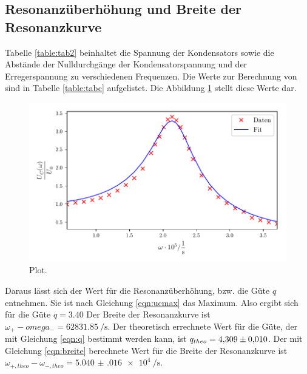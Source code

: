 \subsection{Resonanzüberhöhung und Breite der Resonanzkurve}
Tabelle \ref{table:tab2} beinhaltet die Spannung der Kondensators
sowie die Abstände der Nulldurchgänge der Kondensatorspannung
und der Erregerspannung zu verschiedenen Frequenzen.
Die Werte zur Berechnung von %
sind in Tabelle \ref{table:tabc} aufgelistet.
Die Abbildung \ref{fig:plotc} stellt diese Werte dar.


\begin{figure}
  \centering
  \includegraphics{build/plotc.pdf}
  \caption{Plot.}
  \label{fig:plotc}
\end{figure}
\noindent Daraus lässt sich der Wert für die Resonanzüberhöhung, bzw. die Güte $q$ entnehmen.
Sie ist nach Gleichung \eqref{eqn:ucmax} das Maximum.
Also ergibt sich für die Güte $q = \num{3.40}$
Der Breite der Resonanzkurve ist
$\omega_{+} - omega_{-} = \SI[per-mode=fraction]{62831.85}{\per\second}$. %
\newline
Der theoretisch errechnete Wert für die Güte, der mit Gleichung
\eqref{eqn:q} bestimmt werden kann, ist $q_{theo} = \num{4.309 \pm.010}$.
Der mit Gleichung \eqref{eqn:breite} berechnete Wert für die Breite der
Resonanzkurve ist
$\omega_{+,theo} - \omega_{-,theo} = \SI[per-mode=fraction]{5.040(016)e4}{\per\second}$.

